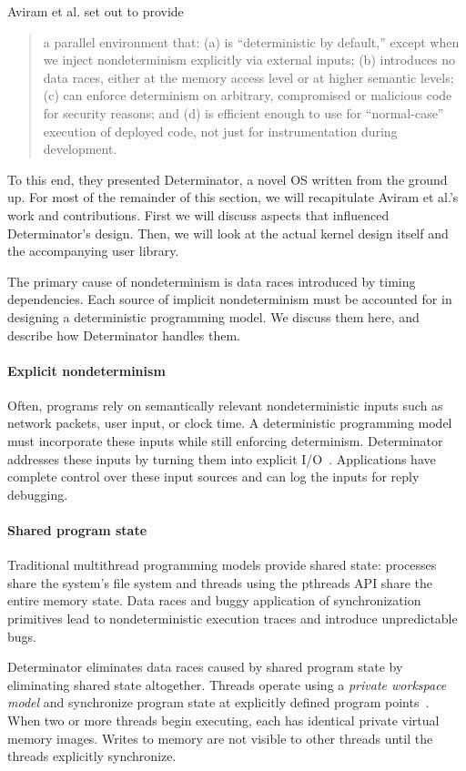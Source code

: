 Aviram et al. set out to provide
\begin{quote}
a parallel environment that:
(a) is ``deterministic by default,'' except when
we inject nondeterminism explicitly via external inputs;
(b) introduces no data races, either at the memory access level
or at higher semantic levels; (c)
can enforce determinism on arbitrary, compromised or
malicious code for security reasons; and (d) is efficient
enough to use for ``normal-case'' execution of deployed
code, not just for instrumentation during development. \cite{Aviram10}
\end{quote}

To this end, they presented Determinator, a novel OS written from the ground up.
For most of the remainder of this section, we will recapitulate Aviram et al.'s
work and contributions. First we will discuss aspects that influenced
Determinator's design. Then, we will look at the actual kernel design itself
and the accompanying user library.

The primary cause of nondeterminism is data races introduced by timing
dependencies. Each source of implicit nondeterminism must be accounted for in
designing a deterministic programming model. We discuss them here, and describe
how Determinator handles them.

\paragraph{Explicit nondeterminism}
Often, programs rely on semantically relevant nondeterministic inputs such as
network packets, user input, or clock time. A deterministic programming model
must incorporate these inputs while still enforcing determinism. Determinator
addresses these inputs by turning them into explicit I/O~\cite{Aviram10}.
Applications have complete control over these input sources and can log the
inputs for reply debugging.

\paragraph{Shared program state}
Traditional multithread programming models provide shared state: processes share
the system's file system and threads using the pthreads API share the entire
memory state. Data races and buggy application of synchronization primitives
lead to nondeterministic execution traces and introduce unpredictable bugs.

Determinator eliminates data races caused by shared program state by eliminating
shared state altogether. Threads operate using a \emph{private workspace model}
and synchronize program state at explicitly defined program
points~\cite{Aviram10}. When two or more threads begin executing, each has
identical private virtual memory images. Writes to memory are not visible to
other threads until the threads explicitly synchronize.

